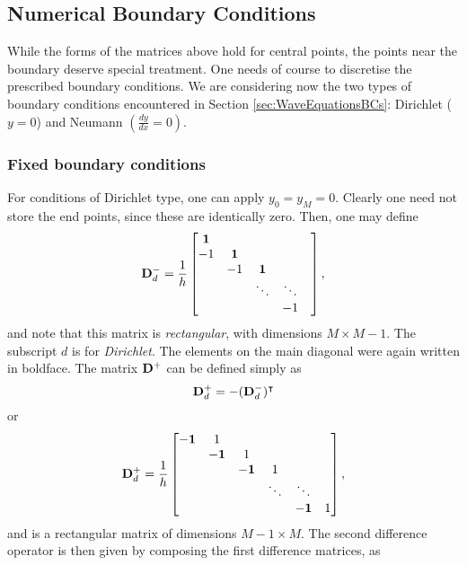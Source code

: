 \subsection{Numerical Boundary Conditions}\label{sec:WEQNmatrices}


While the forms of the matrices above hold for central points, the points near the boundary deserve special treatment. One needs of course to discretise the prescribed boundary conditions. We are considering now the two types of boundary conditions encountered in Section \ref{sec:WaveEquationsBCs}: Dirichlet ($y=0$) and Neumann $\left(\frac{dy}{dx}=0\right)$. 

\subsubsection{Fixed boundary conditions}
For conditions of Dirichlet type, one can apply $y_0=y_M=0$. Clearly one need not store the end points, since these are identically zero. Then, one may define
\begin{equation}
{\bf D}^-_d  = \frac{1}{h}\begin{bmatrix}
{\bf 1} &  &   &   \\ 
-1& {\bf 1} & & &    \\
&-1 & {\bf 1} & &    \\
& & \ddots & \ddots &    \\
& &  & -1&   
\end{bmatrix},
\end{equation}
and note that this matrix is \emph{rectangular}, with dimensions $M \times M-1$. The subscript $d$ is for \emph{Dirichlet}. The elements on the main diagonal were again written in boldface. The matrix ${\bf D}^{+}$ can be defined simply as
\begin{equation}
{\bf D}^+_{d} = -({\bf D}^-_d)^\intercal
\end{equation}
or
\begin{equation}
{\bf D}^+_d  = \frac{1}{h}\begin{bmatrix}
{\bf -1} &  1 &   &   &\\ 
& {\bf -1} & 1 & &  &  \\
& & {\bf -1} & 1&   & \\
& & & \ddots &  \ddots & \\
& & &  & {\bf -1}&   1
\end{bmatrix},
\end{equation}
and is a rectangular matrix of dimensions $M-1 \times M$. The second difference operator is then given by composing the first difference matrices, as

